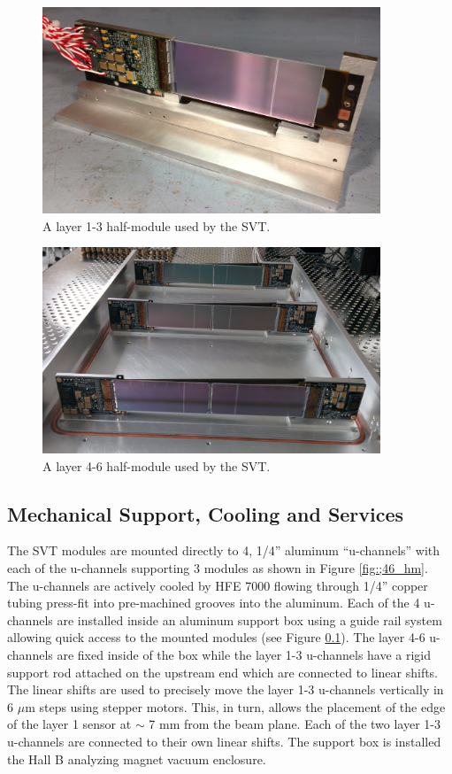 \begin{figure}
    \centering
    \includegraphics[width=0.9\textwidth]{images/l13_half_module.jpg}
    \caption{A layer 1-3 half-module used by the SVT. }
    \label{fig:l13_hm}
\end{figure}
\begin{figure}
    \centering
    \includegraphics[width=0.9\textwidth]{images/l46_half_module.jpg}
    \caption{A layer 4-6 half-module used by the SVT. }
    \label{fig:l46_hm}
\end{figure}


\subsection{Mechanical Support, Cooling and Services}

The SVT modules are mounted directly to 4,  1/4'' aluminum ``u-channels'' with each
of the u-channels supporting 3 modules as shown in Figure \ref{fig:;46_hm}.  
The u-channels are actively cooled by HFE 7000 flowing through 1/4'' copper 
tubing press-fit into pre-machined grooves into the aluminum. Each of the 4 
u-channels are installed inside an aluminum support box using a guide rail system
allowing quick access to the mounted modules (see Figure \ref{}).  The layer 
4-6 u-channels are fixed inside of the box while the layer 1-3 u-channels 
have a rigid support rod attached on the upstream end which are connected to 
linear shifts. The linear shifts are used to precisely move the layer 1-3 
u-channels vertically in 6 $\mu$m steps using stepper motors.  This, in turn, 
allows the placement of the edge of the layer 1 sensor at $\sim$ 7 mm from the 
beam plane.  Each of the two layer 1-3 u-channels are connected to their own 
linear shifts.  The support box is installed the Hall B analyzing magnet 
vacuum enclosure. 

